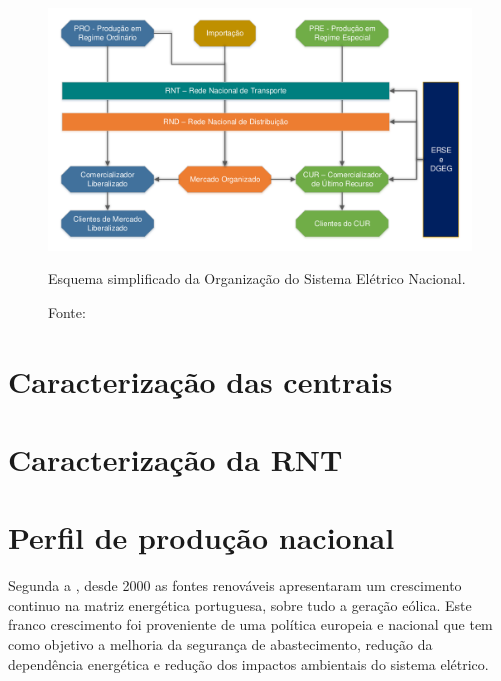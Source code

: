\begin{figure}[H]
	\centering
	\captionsetup{width=\textwidth, font=footnotesize, textfont=bf}	
	\includegraphics[width=\textwidth]{img/Organizacao_SEP_PT.pdf}
	\caption{Esquema simplificado da Organização do Sistema Elétrico Nacional.}
	\vspace{-3.5mm}
	\caption*{Fonte: \cite{gil2010analise}}
	\label{fig:Organizacao_SEP_PT}
\end{figure}

\section{Caracterização das centrais}


\section{Caracterização da RNT} 



\section{Perfil de produção nacional} 

Segunda a , desde 2000 as fontes renováveis apresentaram um crescimento continuo na matriz energética portuguesa, sobre tudo a geração eólica. Este franco crescimento foi proveniente de uma política europeia e nacional que tem como objetivo a melhoria da segurança de abastecimento, redução da dependência energética e redução dos impactos ambientais do sistema elétrico.  

